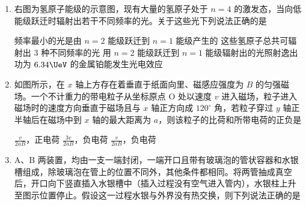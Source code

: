 \documentclass[\gkver]{gaokaozhenti}
\begin{document}
\begin{enumerate}
{$\sqrt{\frac{m_{1}R_{2}}{m_{2}R_{1}}}v$，$\sqrt{\frac{m_{2}R_{1}^{3}}{m_{1}R_{2}^{3}}}T$}
{$\sqrt{\frac{m_{2}R_{1}}{m_{1}R_{2}}}v$，$\sqrt{\frac{m_{2}R_{1}^{3}}{m_{1}R_{2}^{3}}}T$}
{$\sqrt{\frac{m_{1}R_{2}}{m_{2}R_{1}}}v$，$\sqrt{\frac{m_{1}R_{2}^{3}}{m_{2}R_{1}^{3}}}T$}


\item
右图为氢原子能级的示意图，现有大量的氢原子处于 $n=4$ 的激发态，当向低能级跃迁时辐射出若干不同频率的光。关于这些光下列说法正确的是


{频率最小的光是由 $n=2$ 能级跃迁到 $n=1$ 能级产生的}
{这些氢原子总共可辐射出 $3$ 种不同频率的光}
{用 $n=2$ 能级跃迁到 $n=1$ 能级辐射出的光照射逸出功为 $6.34\UeV$ 的金属铂能发生光电效应}


\item
如图所示，在 $x$ 轴上方存在着垂直于纸面向里、磁感应强度为 $B$ 的匀强磁场。一个不计重力的带电粒子从坐标原点 O 处以速度 $v$ 进入磁场，粒子进入磁场时的速度方向垂直于磁场且与 $x$ 轴正方向成 $120^{\circ}$ 角，若粒子穿过 $y$ 轴正半轴后在磁场中到 $x$ 轴的最大距离为 $a$，则该粒子的比荷和所带电荷的正负是


{$\frac{v}{2aB}$，正电荷}
{$\frac{3v}{2aB}$，负电荷}
{$\frac{v}{2aB}$，负电荷}


\item
A、B 两装置，均由一支一端封闭，一端开口且带有玻璃泡的管状容器和水银槽组成，除玻璃泡在管上的位置不同外，其他条件都相同。将两管抽成真空后，开口向下竖直插入水银槽中（插入过程没有空气进入管内），水银柱上升至图示位置停止。假设这一过程水银与外界没有热交换，则下列说法正确的是


\end{enumerate}
\end{document}
